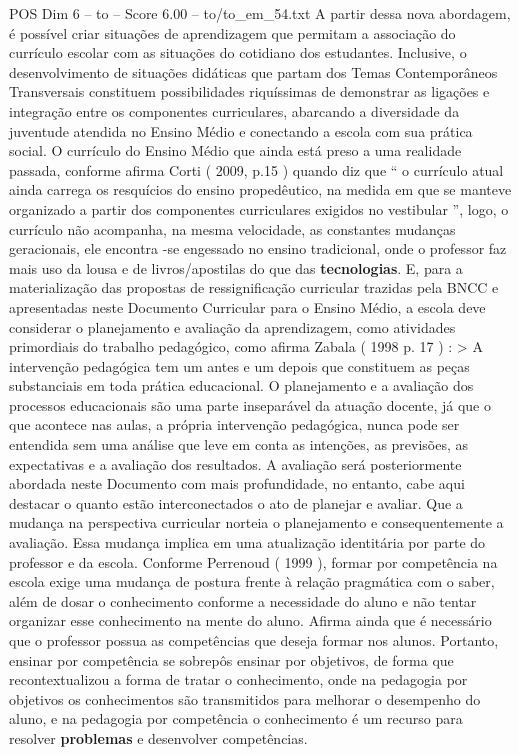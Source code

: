 \begin{textsample}{POS Dim 6 – to – Score 6.00 – to/to\_em\_54.txt}
A partir dessa nova abordagem, é possível criar situações de aprendizagem que permitam a associação do currículo escolar com as situações do cotidiano dos estudantes.
Inclusive, o desenvolvimento de situações didáticas que partam dos Temas Contemporâneos Transversais constituem possibilidades riquíssimas de demonstrar as ligações e integração entre os componentes curriculares, abarcando a diversidade da juventude atendida no Ensino Médio e conectando a escola com sua prática social.
O currículo do Ensino Médio que ainda está preso a uma realidade passada, conforme afirma Corti ( 2009, p.15 ) quando diz que “ o currículo atual ainda carrega os resquícios do ensino propedêutico, na medida em que se manteve organizado a partir dos componentes curriculares exigidos no vestibular ”, logo, o currículo não acompanha, na mesma velocidade, as constantes mudanças geracionais, ele encontra -se engessado no ensino tradicional, onde o professor faz mais uso da lousa e de livros/apostilas do que das \textbf{tecnologias}.
E, para a materialização das propostas de ressignificação curricular trazidas pela BNCC e apresentadas neste Documento Curricular para o Ensino Médio, a escola deve considerar o planejamento e avaliação da aprendizagem, como atividades primordiais do trabalho pedagógico, como afirma Zabala ( 1998 p. 17 ) : > A intervenção pedagógica tem um antes e um depois que constituem as peças substanciais em toda prática educacional.
O planejamento e a avaliação dos processos educacionais são uma parte inseparável da atuação docente, já que o que acontece nas aulas, a própria intervenção pedagógica, nunca pode ser entendida sem uma análise que leve em conta as intenções, as previsões, as expectativas e a avaliação dos resultados.
A avaliação será posteriormente abordada neste Documento com mais profundidade, no entanto, cabe aqui destacar o quanto estão interconectados o ato de planejar e avaliar.
Que a mudança na perspectiva curricular norteia o planejamento e consequentemente a avaliação.
Essa mudança implica em uma atualização identitária por parte do professor e da escola.
Conforme Perrenoud ( 1999 ), formar por competência na escola exige uma mudança de postura frente à relação pragmática com o saber, além de dosar o conhecimento conforme a necessidade do aluno e não tentar organizar esse conhecimento na mente do aluno.
Afirma ainda que é necessário que o professor possua as competências que deseja formar nos alunos.
Portanto, ensinar por competência se sobrepôs ensinar por objetivos, de forma que recontextualizou a forma de tratar o conhecimento, onde na pedagogia por objetivos os conhecimentos são transmitidos para melhorar o desempenho do aluno, e na pedagogia por competência o conhecimento é um recurso para resolver \textbf{problemas} e desenvolver competências.

\end{textsample}
